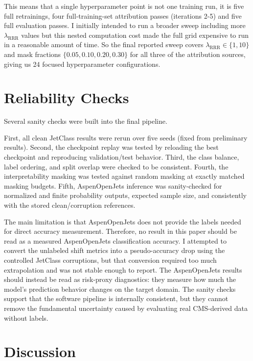 \documentclass[11pt]{article}
\begin{document}
This means that a single hyperparameter point is not one training run, it is five full retrainings, four full-training-set attribution passes (iterations 2-5) and five full evaluation passes. I initially intended to run a broader sweep including more $\lambda_{\mathrm{RRR}}$ values but this nested computation cost made the full grid expensive to run in a reasonable amount of time. So the final reported sweep covers $\lambda_{\mathrm{RRR}}\in\{1,10\}$ and mask fractions $\{0.05,0.10,0.20,0.30\}$ for all three of the attribution sources, giving us 24 focused hyperparameter configurations.


\section{Reliability Checks}

Several sanity checks were built into the final pipeline. 

First, all clean JetClass results were rerun over five seeds (fixed from preliminary results). Second, the checkpoint replay was tested by reloading the best checkpoint and reproducing validation/test behavior. Third, the class balance, label ordering, and split overlap were checked to be consistent. Fourth, the interpretability masking was tested against random masking at exactly matched masking budgets. Fifth, AspenOpenJets inference was sanity-checked for normalized and finite probability outputs, expected sample size, and consistently with the stored clean/corruption references.

The main limitation is that AspenOpenJets does not provide the labels needed for direct accuracy measurement. Therefore, no result in this paper should be read as a measured AspenOpenJets classification accuracy. I attempted to convert the unlabeled shift metrics into a pseudo-accuracy drop using the controlled JetClass corruptions, but that conversion required too much extrapolation and was not stable enough to report. The AspenOpenJets results should instead be read as risk-proxy diagnostics: they measure how much the model's prediction behavior changes on the target domain. The sanity checks support that the software pipeline is internally consistent, but they cannot remove the fundamental uncertainty caused by evaluating real CMS-derived data without labels.




\section{Discussion}
\end{document}
